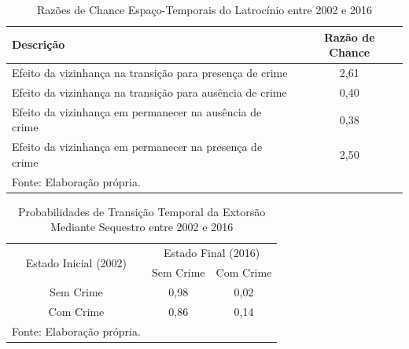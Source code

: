 \documentclass[12pt,openright,oneside,a4paper,english,french,spanish]{abntex2}
\numberwithin{table}{section} %
\numberwithin{figure}{section} %
\begin{document}
\begin{subappendices}
\begin{table}[H]
\centering
\caption{Razões de Chance Espaço-Temporais do Latrocínio entre 2002 e 2016}
        \begin{tabular}{lc}
            \hline
            {\textbf{Descrição}} & {\textbf{Razão de Chance}} \\\hline
            {Efeito da vizinhança na transição para presença de crime} & {2,61} \\
            {Efeito da vizinhança na transição para ausência de crime} & {0,40} \\
            {Efeito da vizinhança em permanecer na ausência de crime} & {0,38} \\
            {Efeito da vizinhança em permanecer na presença de crime} & {2,50} \\\hline
            \tiny Fonte: Elaboração própria.
        \end{tabular}
    \label{tab:odds_espaco_tempo_latrocinio_2002_2016}
\end{table}



















\begin{table}[H]
\centering
\caption{Probabilidades de Transição Temporal da Extorsão Mediante Sequestro entre 2002 e 2016}
        \begin{tabular}{ccc}
            \hline
            \multirow{2}{*}{Estado Inicial (2002)} & \multicolumn{2}{c}{Estado Final (2016)}  \\\cline{2-3} 
                                     & \multicolumn{1}{l}{Sem Crime} & \multicolumn{1}{l}{Com Crime} \\\hline
            {Sem Crime} & {0,98} & {0,02} \\                \hline
            {Com Crime} & {0,86} & {0,14} \\                \hline
            \tiny Fonte: Elaboração própria.
        \end{tabular}
    \label{tab:prob_tempo_extoMS_2002_2016}
\end{table}


\end{subappendices}
\end{document}
